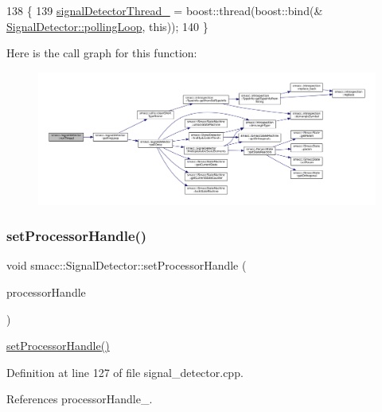 \begin{DoxyCode}
138     \{
139         \hyperlink{classsmacc_1_1SignalDetector_a4346a400cd37eafc5d1d2e63d975785e}{signalDetectorThread\_} = boost::thread(boost::bind(&
      \hyperlink{classsmacc_1_1SignalDetector_a2665e66cdae9f6533c64bbcecf3fa199}{SignalDetector::pollingLoop}, \textcolor{keyword}{this}));
140     \}
\end{DoxyCode}
Here is the call graph for this function\+:
\nopagebreak
\begin{figure}[H]
\begin{center}
\leavevmode
\includegraphics[width=350pt]{classsmacc_1_1SignalDetector_a48b3fee853ddcb25732408b22ecfcf39_cgraph}
\end{center}
\end{figure}
\mbox{\label{classsmacc_1_1SignalDetector_ac1197a77c32a3b817005391e550ce646}} 
\subsubsection{\texorpdfstring{set\+Processor\+Handle()}{setProcessorHandle()}}
{\footnotesize\ttfamily void smacc\+::\+Signal\+Detector\+::set\+Processor\+Handle (\begin{DoxyParamCaption}\item[{Smacc\+Fifo\+Scheduler\+::processor\+\_\+handle}]{processor\+Handle }\end{DoxyParamCaption})}

\hyperlink{classsmacc_1_1SignalDetector_ac1197a77c32a3b817005391e550ce646}{set\+Processor\+Handle()} 

Definition at line 127 of file signal\+\_\+detector.\+cpp.



References processor\+Handle\+\_\+.



